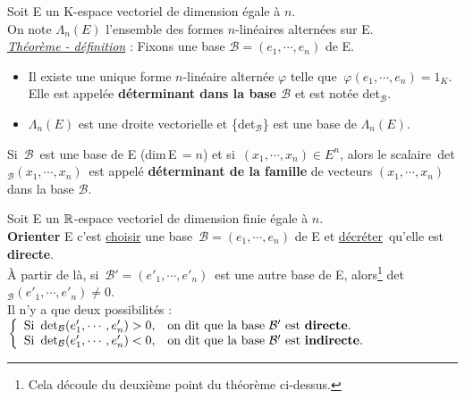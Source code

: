 \vspace{1.8cm}

Soit E un K-espace vectoriel de dimension égale à $n$.\\
On note \(\Lambda_n(E)\) l'ensemble des formes $n$-linéaires alternées sur E.\\
\underline{\emph{Théorème - définition}} : Fixons une base \(\mathcal{B}=(e_1,\cdots,e_n)\) de E.\vspace{-0.1cm}
\begin{itemize}[leftmargin=2cm, label=•]
    \item Il existe une unique forme $n$-linéaire alternée \(\varphi\) telle que \(\ \varphi(e_1,\cdots,e_n)=1_K\).\\
    Elle est appelée \textbf{déterminant dans la base \(\mathcal{B}\)} et est notée det\(_\mathcal{B}\).\vspace{0.1cm}

    \item \(\Lambda_n(E)\) est une droite vectorielle et \{det\(_\mathcal{B}\)\} est une base de \(\Lambda_n(E).\)
\end{itemize}

\vspace{1.8cm}

\noindent Si \(\,\mathcal{B}\,\) est une base de E (dim\,E$\,=n$) et si \(\,(x_1,\cdots,x_n)\in E^n\), alors le scalaire\, det\(_\mathcal{B}(x_1,\cdots,x_n)\,\) est appelé \textbf{déterminant de la famille} de vecteurs \((x_1,\cdots,x_n)\) dans la base \(\mathcal{B}\).

\vspace{2cm}

Soit E un \(\mathbb{R}\)-espace vectoriel de dimension finie égale à $n$.\\
\textbf{Orienter} E c'est \underline{choisir} une base \(\,\mathcal{B}=(e_1,\cdots,e_n)\) de E et \guillemotleft\underline{décréter}\guillemotright \ qu'elle est \textbf{directe}. \\
À partir de là, si \(\,\mathcal{B}'=(e'_1,\cdots,e'_n)\,\) est une autre base de E, alors\footnote{Cela découle du deuxième point du théorème ci-dessus.} det\(_\mathcal{B}(e'_1,\cdots,e'_n)\neq 0\).\vspace{0.25cm}\\
Il n'y a que deux possibilités : \(\left\{\begin{array}{ll}
    \text{Si } \det_\mathcal{B}(e'_1,\cdots,e'_n)>0, & \text{on dit que la base }\mathcal{B}' \text{ est \textbf{directe}\index{base directe}}.  \\
     \text{Si } \det_\mathcal{B}(e'_1,\cdots,e'_n)<0, & \text{on dit que la base }\mathcal{B}' \text{ est \textbf{indirecte}\index{base indirecte}}.
\end{array} \right.\)

